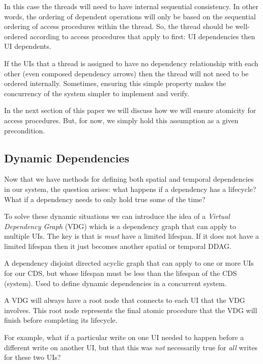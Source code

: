 In this case the threads will need to have internal sequential consistency. In other words, the ordering of dependent operations will only be based on the sequential ordering of access procedures within the thread. So, the thread should be well-ordered according to access procedures that apply to first: UI dependencies then UI dependents.

If the UIs that a thread is assigned to have no dependency relationship with each other (even composed dependency arrows) then the thread will not need to be ordered internally. Sometimes, ensuring this simple property makes the concurrency of the system simpler to implement and verify.

In the next section of this paper we will discuss how we will ensure atomicity for access procedures. But, for now, we simply hold this assumption as a given precondition.

\subsection{Dynamic Dependencies}

Now that we have methods for defining both spatial and temporal dependencies in our system, the question arises: what happens if a dependency has a lifecycle? What if a dependency needs to only hold true some of the time?

To solve these dynamic situations we can introduce the idea of a \textit{Virtual Dependency Graph} (VDG) which is a dependency graph that can apply to multiple UIs. The key is that is \textit{must} have a limited lifespan. If it does not have a limited lifespan then it just becomes another spatial or temporal DDAG.

\begin{con-def}
	\label{virtual-ddag}
	A dependency disjoint directed acyclic graph that can apply to one or more UIs for our CDS, but whose lifespan must be less than the lifespan of the CDS (system). Used to define dynamic dependencies in a concurrent system.
\end{con-def}

A VDG will always have a root node that connects to each UI that the VDG involves. This root node represents the final atomic procedure that the VDG will finish before completing its lifecycle.

For example, what if a particular write on one UI needed to happen before a different write on another UI, but that this was \textit{not} necessarily true for \textit{all} writes for these two UIs?

